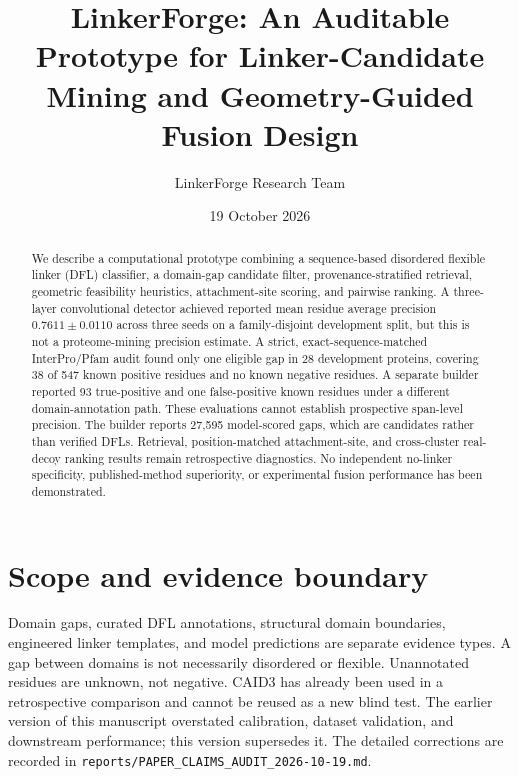 \documentclass{article}
\title{LinkerForge: An Auditable Prototype for Linker-Candidate Mining and Geometry-Guided Fusion Design}
\author{LinkerForge Research Team}
\date{19 October 2026}
\begin{document}
\maketitle
\begin{abstract}
We describe a computational prototype combining a sequence-based disordered flexible linker (DFL) classifier, a domain-gap candidate filter, provenance-stratified retrieval, geometric feasibility heuristics, attachment-site scoring, and pairwise ranking. A three-layer convolutional detector achieved reported mean residue average precision $0.7611\pm0.0110$ across three seeds on a family-disjoint development split, but this is not a proteome-mining precision estimate. A strict, exact-sequence-matched InterPro/Pfam audit found only one eligible gap in 28 development proteins, covering 38 of 547 known positive residues and no known negative residues. A separate builder reported 93 true-positive and one false-positive known residues under a different domain-annotation path. These evaluations cannot establish prospective span-level precision. The builder reports 27,595 model-scored gaps, which are candidates rather than verified DFLs. Retrieval, position-matched attachment-site, and cross-cluster real-decoy ranking results remain retrospective diagnostics. No independent no-linker specificity, published-method superiority, or experimental fusion performance has been demonstrated.
\end{abstract}

\section{Scope and evidence boundary}
Domain gaps, curated DFL annotations, structural domain boundaries, engineered linker templates, and model predictions are separate evidence types. A gap between domains is not necessarily disordered or flexible. Unannotated residues are unknown, not negative. CAID3 has already been used in a retrospective comparison and cannot be reused as a new blind test. The earlier version of this manuscript overstated calibration, dataset validation, and downstream performance; this version supersedes it. The detailed corrections are recorded in \texttt{reports/PAPER\_CLAIMS\_AUDIT\_2026-10-19.md}.
\end{document}

